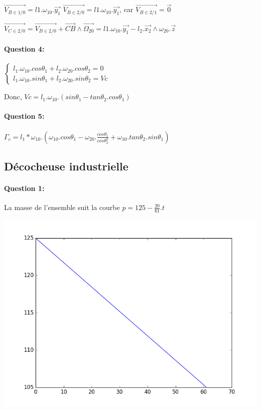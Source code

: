 $\overrightarrow{V_{B\in1/0}}=l1.\omega_{10}.\overrightarrow{y_1}$
$\overrightarrow{V_{B\in2/0}}=l1.\omega_{10}.\overrightarrow{y_1}$, car $\overrightarrow{V_{B\in2/1}}=\overrightarrow{0}$

$\overrightarrow{V_{C\in2/0}}=\overrightarrow{V_{B\in2/0}}+\overrightarrow{CB}\wedge\overrightarrow{\Omega_{20}}
=l1.\omega_{10}.\overrightarrow{y_1}-l_2.\overrightarrow{x_2}\wedge\omega_{20}.\overrightarrow{z}$

\paragraph{Question 4:}

$\left\{\begin{array}{l}
l_1.\omega_{10}.cos\theta_1+l_2.\omega_{20}.cos\theta_2=0\\
l_1.\omega_{10}.sin\theta_1+l_2.\omega_{20}.sin\theta_2=Vc
\end{array}\right.$

Donc, $Vc=l_1.\omega_{10}.(sin\theta_1-tan\theta_2.cos\theta_1)$

\paragraph{Question 5:} 

$\Gamma_c=l_1*\omega_{10}.\left(\omega_{10}.cos\theta_1-\omega_{20}.\frac{cos\theta_1}{cos\theta_2^2}+\omega_{10}.tan\theta_2.sin\theta_1\right)$

\subsection{Décocheuse industrielle}

\paragraph{Question 1:}

La masse de l'ensemble suit la courbe $p=125-\frac{20}{61}.t$

\begin{center}
 \includegraphics[width=0.3\linewidth]{img/courbe_poids}
\end{center}

